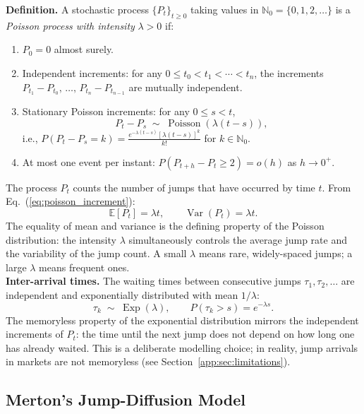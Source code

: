 \textbf{Definition.} A stochastic process $\{P_t\}_{t \geq 0}$ taking values in
$\mathbb{N}_0 = \{0, 1, 2, \ldots\}$ is a \textit{Poisson process with intensity}
$\lambda > 0$ if:
\begin{enumerate}
    \item $P_0 = 0$ almost surely.
    \item Independent increments: for any $0 \leq t_0 < t_1 < \cdots < t_n$,
    the increments $P_{t_1} - P_{t_0},\, \ldots,\, P_{t_n} - P_{t_{n-1}}$ are
    mutually independent.
    \item Stationary Poisson increments: for any $0 \leq s < t$,
    \begin{equation}
        \label{eq:poisson_increment}
        P_t - P_s \;\sim\; \operatorname{Poisson}(\lambda(t - s)),
    \end{equation}
    i.e., $P(P_t - P_s = k) = \frac{e^{-\lambda(t-s)}[\lambda(t-s)]^k}{k!}$
    for $k \in \mathbb{N}_0$.
    \item At most one event per instant: $P(P_{t+h} - P_t \geq 2) = o(h)$
    as $h \to 0^+$.
\end{enumerate}

The process $P_t$ counts the number of jumps that have occurred by time $t$.
From Eq.~(\ref{eq:poisson_increment}):
\[
    \mathbb{E}[P_t] = \lambda t, \qquad \operatorname{Var}(P_t) = \lambda t.
\]
The equality of mean and variance is the defining property of the Poisson
distribution: the intensity $\lambda$ simultaneously controls the average
jump rate and the variability of the jump count. A small $\lambda$ means
rare, widely-spaced jumps; a large $\lambda$ means frequent ones.\\

\textbf{Inter-arrival times.} The waiting times between consecutive jumps
$\tau_1, \tau_2, \ldots$ are independent and exponentially distributed with
mean $1/\lambda$:
\[
    \tau_k \;\sim\; \operatorname{Exp}(\lambda), \qquad
    P(\tau_k > s) = e^{-\lambda s}.
\]
The memoryless property of the exponential distribution mirrors the independent
increments of $P_t$: the time until the next jump does not depend on how long
one has already waited. This is a deliberate modelling choice; in reality, jump
arrivals in markets are not memoryless (see Section~\ref{app:sec:limitations}).

\subsection{Merton's Jump-Diffusion Model}

